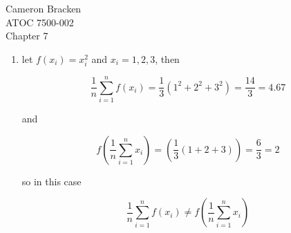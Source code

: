 \documentclass[11pt]{article}
\begin{document}
\begin{flushright}
Cameron Bracken\\
ATOC 7500-002\\
Chapter 7
\end{flushright}

\begin{enumerate}
\item let $f(x_i)=x_i^2$ and $x_i = 1,2,3$, then

$$\frac{1}{n}\displaystyle\sum_{i=1}^nf(x_i) = \frac{1}{3}(1^2+2^2+3^2)=\frac{14}{3}=4.67$$

and

$$f\left(\frac{1}{n}\displaystyle\sum_{i=1}^nx_i\right) = \left(\frac{1}{3}(1+2+3)\right)=\frac{6}{3}=2$$

so in this case 

$$\frac{1}{n}\displaystyle\sum_{i=1}^nf(x_i) \neq f\left(\frac{1}{n}\displaystyle\sum_{i=1}^nx_i\right)$$

\end{enumerate}
\end{document}
